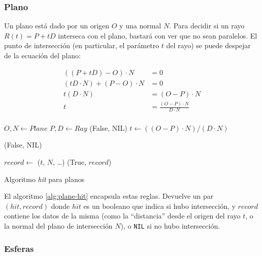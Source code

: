 \subsubsection{Plano}

Un plano está dado por un origen $O$ y una normal $N$. Para decidir si un rayo
$R(t) = P + tD$ interseca con el plano, bastará con ver que no sean paralelos.
El punto de intersección (en particular, el parámetro $t$ del rayo) se puede
despejar de la ecuación del plano:

\begin{align*}
    ((P + tD) - O) \cdot N &= 0 \\
    (tD \cdot N) + (P - O) \cdot N &= 0 \\
    t(D \cdot N) &= (O - P) \cdot N \\
    t &= \frac{(O - P) \cdot N}{D \cdot N} \\
\end{align*}

\begin{algorithm}[H]
\begin{algorithmic}[1]
    \State $O, N \gets Plane$ 
    \State $P, D \gets Ray$ 
     
        \State \Return (False, NIL)
    \EndIf
    \State $t \gets ((O - P) \cdot N)/(D \cdot N)$

     
        \State \Return (False, NIL)
    \EndIf

    \State $record \gets$ ($t$, $N$, \dots) 
    \State \Return (True, $record$)
\EndFunction
\end{algorithmic}
\caption{Algoritmo \textit{hit} para planos}
\label{alg:plane-hit}
\end{algorithm}

El algoritmo \ref{alg:plane-hit} encapsula estas reglas. Devuelve un par $(hit,
record)$ donde $hit$ es un booleano que indica si hubo intersección, y $record$
contiene los datos de la misma (como la ``distancia'' desde el origen del rayo
$t$, o la normal del plano de intersección $N$), o \texttt{NIL} si no hubo
intersección.

\subsubsection{Esferas}


